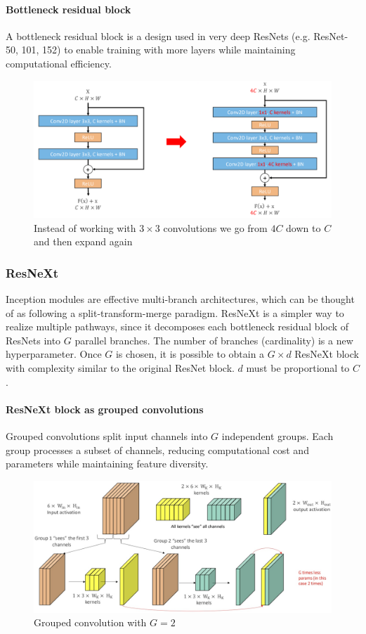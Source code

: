 \paragraph{Bottleneck residual block}
A bottleneck residual block is a design used in very deep ResNets (e.g. ResNet-50, 101, 152) to enable training with more layers while maintaining computational efficiency.
\begin{figure}[htbp]
  \centering
  \includegraphics[width=0.8\linewidth]{./img/resnet_bottleneck.png}
  \caption{Instead of working with $3 \times 3$ convolutions we go from $4C$ down to $C$ and then expand again}
\end{figure}

\subsubsection{ResNeXt}
Inception modules are effective multi-branch architectures, which can be thought of as following a split-transform-merge paradigm.
ResNeXt is a simpler way to realize multiple pathways, since it decomposes each bottleneck residual block of ResNets into $G$ parallel branches.
The number of branches (cardinality) is a new hyperparameter.
Once $G$ is chosen, it is possible to obtain a $G \times d$ ResNeXt block with complexity similar to the original ResNet block.
$d$ must be proportional to $C$.

\paragraph{ResNeXt block as grouped convolutions}

Grouped convolutions split input channels into $G$ independent groups.
Each group processes a subset of channels, reducing computational cost and parameters while maintaining feature diversity.

\begin{figure}[htbp]
  \centering
  \includegraphics[width=0.8\linewidth]{./img/grouped_convolutions.jpg}
  \caption{Grouped convolution with $G=2$}
\end{figure}

